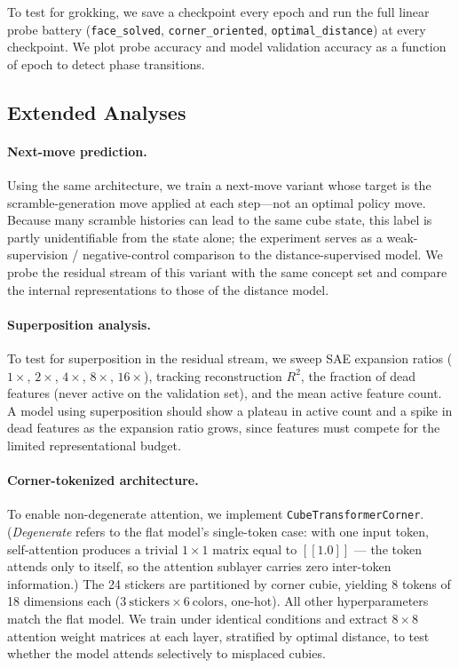 \documentclass[12pt]{article}
\begin{document}
To test for grokking, we save a checkpoint every epoch and run the full linear
probe battery (\texttt{face\_solved}, \texttt{corner\_oriented},
\texttt{optimal\_distance}) at every checkpoint.  We plot probe accuracy and
model validation accuracy as a function of epoch to detect phase transitions.

\subsection{Extended Analyses}

\paragraph{Next-move prediction.}

Using the same architecture, we train a next-move variant whose target is the
scramble-generation move applied at each step---not an optimal policy move.
Because many scramble histories can lead to the same cube state, this label is
partly unidentifiable from the state alone; the experiment serves as a
weak-supervision / negative-control comparison to the distance-supervised model.
We probe the residual stream of this variant with the same concept set and compare
the internal representations to those of the distance model.

\paragraph{Superposition analysis.}

To test for superposition in the residual stream, we sweep SAE expansion ratios
($1\times$, $2\times$, $4\times$, $8\times$, $16\times$), tracking reconstruction
$R^2$, the fraction of dead features (never active on the validation set), and the
mean active feature count.  A model using superposition should show a plateau in
active count and a spike in dead features as the expansion ratio grows, since
features must compete for the limited representational budget.

\paragraph{Corner-tokenized architecture.}

To enable non-degenerate attention, we implement \texttt{CubeTransformerCorner}.
(\emph{Degenerate} refers to the flat model's single-token case: with one input
token, self-attention produces a trivial $1{\times}1$ matrix equal to $[[1.0]]$
--- the token attends only to itself, so the attention sublayer carries zero
inter-token information.)  The 24 stickers are partitioned by corner cubie,
yielding 8 tokens of 18 dimensions each
($3\ \text{stickers} \times 6\ \text{colors}$, one-hot).  All other
hyperparameters match the flat model.  We train under identical conditions
and extract $8 \times 8$ attention weight matrices at each layer, stratified by
optimal distance, to test whether the model attends selectively to misplaced
cubies.
\end{document}
